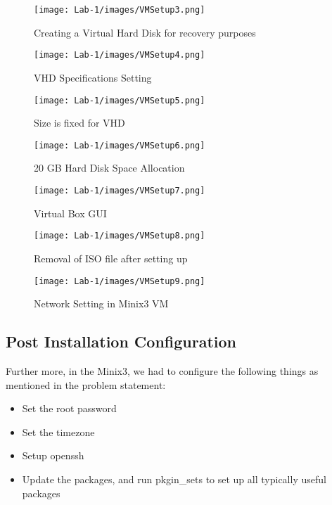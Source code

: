\documentclass[12pt]{article}
\begin{document}
\begin{figure}
    \centering
    \texttt{[image: Lab-1/images/VMSetup3.png]}
    \caption{Creating a Virtual Hard Disk for recovery purposes}
\end{figure}

\begin{figure}
    \centering
    \texttt{[image: Lab-1/images/VMSetup4.png]}
    \caption{VHD Specifications Setting}
\end{figure}

\begin{figure}
    \centering
    \texttt{[image: Lab-1/images/VMSetup5.png]}
    \caption{Size is fixed for VHD}
\end{figure}

\begin{figure}
    \centering
    \texttt{[image: Lab-1/images/VMSetup6.png]}
    \caption{20 GB Hard Disk Space Allocation}
\end{figure}

\begin{figure}
    \centering
    \texttt{[image: Lab-1/images/VMSetup7.png]}
    \caption{Virtual Box GUI}
\end{figure}

\begin{figure}
    \centering
    \texttt{[image: Lab-1/images/VMSetup8.png]}
    \caption{Removal of ISO file after setting up}
\end{figure}

\begin{figure}
    \centering
    \texttt{[image: Lab-1/images/VMSetup9.png]}
    \caption{Network Setting in Minix3 VM}
\end{figure}

\subsection{Post Installation Configuration}
Further more, in the Minix3, we had to configure the following things as mentioned in the problem statement:
\begin{itemize}
    \item Set the root password
    \item Set the timezone
    \item Setup openssh
    \item Update the packages, and run pkgin\_sets to set up all typically useful packages
\end{itemize}
\end{document}
